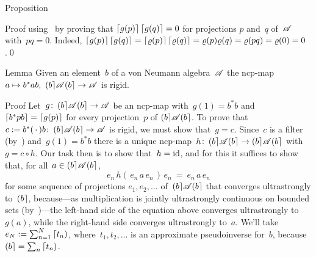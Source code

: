 \documentclass[a]{subfiles}
\begin{document}
\begin{parsec}
\begin{point}{Proposition}
\begin{point}{Proof}
using~
by proving that
$\left\lceil g(p)\right\rceil\left\lceil g(q)\right\rceil=0$
for projections $p$ and~$q$ of~$\mathscr{A}$
with~$pq=0$.
Indeed,
$\left\lceil g(p)\right\rceil\left\lceil g(q)\right\rceil=\left\lceil\varrho(p)\right\rceil\left\lceil\varrho(q)\right\rceil
=\varrho(p)\varrho(q)=\varrho(pq)=\varrho(0)=0$.\qed
\end{point}
\end{point}
\begin{point}{Lemma}%
Given an element~$b$ of a von Neumann algebra~$\mathscr{A}$
the ncp-map $a\mapsto b^* a b,\ \ceilr{b}\!\scrA\!\ceilr{b}\to\scrA$
is rigid.
\begin{point}{Proof}%
Let~$g\colon \left(b\right\rceil\!\mathscr{A}\!\left(b\right\rceil\to\mathscr{A}$
be an ncp-map with~$g(1)=b^*b$
and $\left\lceil b^*pb\right\rceil=\left\lceil g(p)\right\rceil$ for every projection~$p$ 
of $\left(b\right\rceil\!\mathscr{A}\!\left(b\right\rceil$.
To prove that~$c:=b^*(\,\cdot\,) b
\colon \left(b\right\rceil\!\mathscr{A}\!\left(b\right\rceil\to \mathscr{A}$ is rigid,
we must show that~$g=c$.
Since~$c$ is a filter
(by~)
and~$g(1)=b^*b$
there is a unique ncp-map~$h\colon \left(b\right\rceil\!\mathscr{A}\!\left(b\right\rceil
\to\left(b\right\rceil\!\mathscr{A}\!\left(b\right\rceil$
with~$g=c\circ h$.
Our task then is to show that~$h=\operatorname{id}$,
and for this it suffices to show that,
for all~$a\in\left(b\right\rceil\!\mathscr{A}\!\left(b\right\rceil$,
\begin{equation}
\label{filter-rigid-1}
e_n\, h(\,e_n\, a\, e_n\,)\, e_n
\ = \ e_n \, a\,  e_n
\end{equation}
for some sequence of projections $e_1,e_2,\dotsc$
of~$\left(b\right\rceil\!\mathscr{A}\!\left(b\right\rceil$
that converges ultrastrongly to~$\left(b\right\rceil$,
because---as multiplication is jointly ultrastrongly continuous
on bounded sets (by~)---the left-hand side of the equation above 
converges ultrastrongly to~$g(a)$,
while the right-hand side converges ultrastrongly to~$a$.
We'll take $e_N := \sum_{n=1}^N \left\lceil t_n\right)$,
where~$t_1,t_2,\dotsc$
is an approximate pseudoinverse for~$b$,
because $\left(b\right\rceil = \sum_n\left\lceil t_n\right)$.


\end{point}
\end{point}
\end{parsec}
\end{document}
